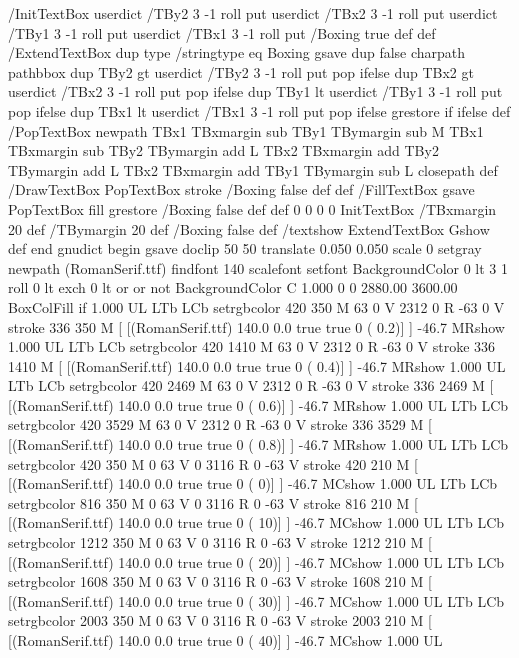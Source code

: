 %
/InitTextBox { userdict /TBy2 3 -1 roll put userdict /TBx2 3 -1 roll put
           userdict /TBy1 3 -1 roll put userdict /TBx1 3 -1 roll put
	   /Boxing true def } def
/ExtendTextBox { dup type /stringtype eq
    { Boxing { gsave dup false charpath pathbbox
      dup TBy2 gt {userdict /TBy2 3 -1 roll put} {pop} ifelse
      dup TBx2 gt {userdict /TBx2 3 -1 roll put} {pop} ifelse
      dup TBy1 lt {userdict /TBy1 3 -1 roll put} {pop} ifelse
      dup TBx1 lt {userdict /TBx1 3 -1 roll put} {pop} ifelse
      grestore } if }
    {} ifelse} def
/PopTextBox { newpath TBx1 TBxmargin sub TBy1 TBymargin sub M
               TBx1 TBxmargin sub TBy2 TBymargin add L
	       TBx2 TBxmargin add TBy2 TBymargin add L
	       TBx2 TBxmargin add TBy1 TBymargin sub L closepath } def
/DrawTextBox { PopTextBox stroke /Boxing false def} def
/FillTextBox { gsave PopTextBox fill grestore /Boxing false def} def
0 0 0 0 InitTextBox
/TBxmargin 20 def
/TBymargin 20 def
/Boxing false def
/textshow { ExtendTextBox Gshow } def
%
end
gnudict begin
gsave
doclip
50 50 translate
0.050 0.050 scale
0 setgray
newpath
(RomanSerif.ttf) findfont 140 scalefont setfont
BackgroundColor 0 lt 3 1 roll 0 lt exch 0 lt or or not {BackgroundColor C 1.000 0 0 2880.00 3600.00 BoxColFill} if
1.000 UL
LTb
LCb setrgbcolor
420 350 M
63 0 V
2312 0 R
-63 0 V
stroke
336 350 M
[ [(RomanSerif.ttf) 140.0 0.0 true true 0 ( 0.2)]
] -46.7 MRshow
1.000 UL
LTb
LCb setrgbcolor
420 1410 M
63 0 V
2312 0 R
-63 0 V
stroke
336 1410 M
[ [(RomanSerif.ttf) 140.0 0.0 true true 0 ( 0.4)]
] -46.7 MRshow
1.000 UL
LTb
LCb setrgbcolor
420 2469 M
63 0 V
2312 0 R
-63 0 V
stroke
336 2469 M
[ [(RomanSerif.ttf) 140.0 0.0 true true 0 ( 0.6)]
] -46.7 MRshow
1.000 UL
LTb
LCb setrgbcolor
420 3529 M
63 0 V
2312 0 R
-63 0 V
stroke
336 3529 M
[ [(RomanSerif.ttf) 140.0 0.0 true true 0 ( 0.8)]
] -46.7 MRshow
1.000 UL
LTb
LCb setrgbcolor
420 350 M
0 63 V
0 3116 R
0 -63 V
stroke
420 210 M
[ [(RomanSerif.ttf) 140.0 0.0 true true 0 ( 0)]
] -46.7 MCshow
1.000 UL
LTb
LCb setrgbcolor
816 350 M
0 63 V
0 3116 R
0 -63 V
stroke
816 210 M
[ [(RomanSerif.ttf) 140.0 0.0 true true 0 ( 10)]
] -46.7 MCshow
1.000 UL
LTb
LCb setrgbcolor
1212 350 M
0 63 V
0 3116 R
0 -63 V
stroke
1212 210 M
[ [(RomanSerif.ttf) 140.0 0.0 true true 0 ( 20)]
] -46.7 MCshow
1.000 UL
LTb
LCb setrgbcolor
1608 350 M
0 63 V
0 3116 R
0 -63 V
stroke
1608 210 M
[ [(RomanSerif.ttf) 140.0 0.0 true true 0 ( 30)]
] -46.7 MCshow
1.000 UL
LTb
LCb setrgbcolor
2003 350 M
0 63 V
0 3116 R
0 -63 V
stroke
2003 210 M
[ [(RomanSerif.ttf) 140.0 0.0 true true 0 ( 40)]
] -46.7 MCshow
1.000 UL
